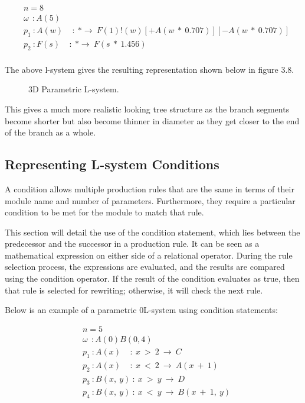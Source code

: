 \begin{equation} \label{parametric l-system practical}
\begin{aligned}
	&n=8 \\
	&\omega~~ : A(5)\\
	&p_1~ :  A(w)~~~~~ :~ * \rightarrow~ F(1)!(w)[+A(w~*~0.707)][-A(w~*~0.707)]\\
	&p_2~ :  F(s)~~~~~ :~ * \rightarrow~ F(s~*~1.456)\\
\end{aligned}
\end{equation}

The above l-system gives the resulting representation shown below in figure 3.8. 

\begin{figure}[htbp]
	{\centering
		\vspace{7px}
		\setlength{\fboxrule}{1pt}
		\caption{3D Parametric L-system.}
	}
\end{figure}
\FloatBarrier

\noindent
This gives a much more realistic looking tree structure as the branch segments become shorter but also become thinner in diameter as they get closer to the end of the branch as a whole. 


\subsection{Representing L-system Conditions} \label{Condition L-system Subsection}

A condition allows multiple production rules that are the same in terms of their module name and number of parameters. Furthermore, they require a particular condition to be met for the module to match that rule. 

This section will detail the use of the condition statement, which lies between the predecessor and the successor in a production rule. It can be seen as a mathematical expression on either side of a relational operator. During the rule selection process, the expressions are evaluated, and the results are compared using the condition operator. If the result of the condition evaluates as true, then that rule is selected for rewriting; otherwise, it will check the next rule. 


Below is an example of a parametric 0L-system using condition statements:

\begin{equation} \label{parametric l-system example}
\begin{aligned}
	&n=5 \\
	&\omega~~ : A(0)B(0,4)\\
	&p_1~ :  A(x)~~~~~ :~ x~ >~ 2~ \rightarrow~ C\\
	&p_2~ :  A(x)~~~~~ :~ x~ <~ 2~ \rightarrow~ A(x~ +~ 1)\\
	&p_3~ :  B(x,~ y)~ :~ x~ >~ y~ \rightarrow~ D\\
	&p_4~ :  B(x,~ y)~ :~ x~ <~ y~ \rightarrow~ B(x~ +~ 1,~ y)\\
\end{aligned}
\end{equation}

